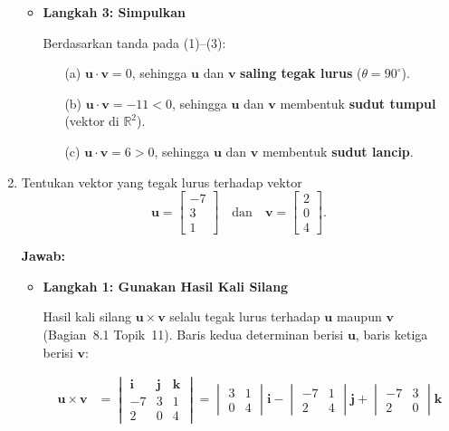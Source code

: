 \documentclass[10pt,a4paper]{article}
\newcounter{eqblock}
\newcommand{\reseteq}{%
  \stepcounter{eqblock}%
  \setcounter{equation}{0}%
  \renewcommand{\theHequation}{\arabic{eqblock}.\arabic{equation}}%
}
\begin{document}
\begin{enumerate}
\begin{itemize}
\item \textbf{Langkah 3: Simpulkan}

Berdasarkan tanda pada (1)--(3):
\begin{itemize}
\item[(a)] $\mathbf{u} \cdot \mathbf{v} = 0$, sehingga $\mathbf{u}$ dan $\mathbf{v}$ \textbf{saling tegak lurus} ($\theta = 90^\circ$).
\item[(b)] $\mathbf{u} \cdot \mathbf{v} = -11 < 0$, sehingga $\mathbf{u}$ dan $\mathbf{v}$ membentuk \textbf{sudut tumpul} (vektor di $\mathbb{R}^2$).
\item[(c)] $\mathbf{u} \cdot \mathbf{v} = 6 > 0$, sehingga $\mathbf{u}$ dan $\mathbf{v}$ membentuk \textbf{sudut lancip}.
\end{itemize}
\end{itemize}

\item Tentukan vektor yang tegak lurus terhadap vektor
\[
\mathbf{u} = \begin{bmatrix} -7 \\ 3 \\ 1 \end{bmatrix} \quad \text{dan} \quad
\mathbf{v} = \begin{bmatrix} 2 \\ 0 \\ 4 \end{bmatrix}.
\]

\textbf{Jawab:}
\begin{itemize}
\item \textbf{Langkah 1: Gunakan Hasil Kali Silang}

Hasil kali silang $\mathbf{u} \times \mathbf{v}$ selalu tegak lurus terhadap $\mathbf{u}$ maupun $\mathbf{v}$ (Bagian~8.1 Topik~11). Baris kedua determinan berisi $\mathbf{u}$, baris ketiga berisi $\mathbf{v}$:
\reseteq
\begin{align}
\mathbf{u} \times \mathbf{v} &= \begin{vmatrix} \mathbf{i} & \mathbf{j} & \mathbf{k} \\ -7 & 3 & 1 \\ 2 & 0 & 4 \end{vmatrix}
= \begin{vmatrix} 3 & 1 \\ 0 & 4 \end{vmatrix}\mathbf{i}
- \begin{vmatrix} -7 & 1 \\ 2 & 4 \end{vmatrix}\mathbf{j}
+ \begin{vmatrix} -7 & 3 \\ 2 & 0 \end{vmatrix}\mathbf{k}
\end{align}


\end{itemize}
\end{enumerate}
\end{document}
